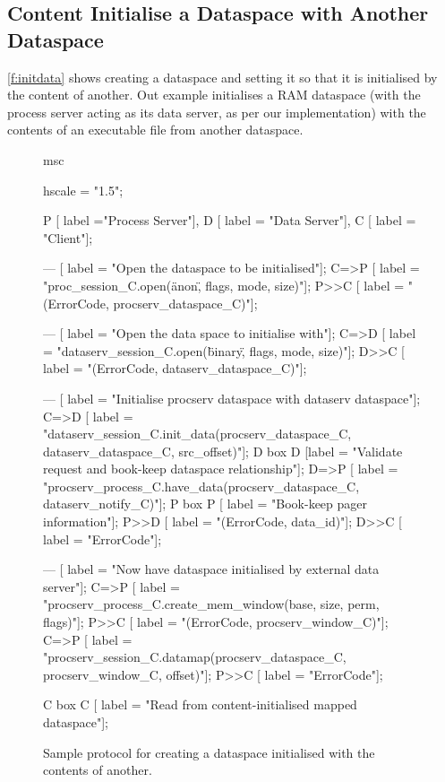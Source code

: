 \clearpage
\subsection{Content Initialise a Dataspace with Another Dataspace}

\autoref{f:initdata} shows creating a dataspace and setting it so that it is initialised by the
content of another. Out example initialises a RAM dataspace (with the process server acting as its
data server, as per our implementation) with the contents of an executable file from another
dataspace.

\begin{figure}[htb]
  \begin{center}
    \begin{msc}
      msc {
        hscale = "1.5";

        P [ label ="Process Server"],
        D [ label = "Data Server"],
        C [ label = "Client"];

        --- [ label = "Open the dataspace to be initialised"];
        C=>P [ label = "proc\_session\_C.open(\"anon\", flags, mode, size)"];
        P>>C [ label = "(ErrorCode, procserv\_dataspace\_C)"];

        --- [ label = "Open the data space to initialise with"];
        C=>D [ label = "dataserv\_session\_C.open(\"binary\", flags, mode, size)"];
        D>>C [ label = "(ErrorCode, dataserv\_dataspace\_C)"];

        --- [ label = "Initialise procserv dataspace with dataserv dataspace"];
        C=>D [ label = "dataserv\_session\_C.init\_data(procserv\_dataspace\_C, dataserv\_dataspace\_C, src\_offset)"];
        D box D [label = "Validate request and book-keep dataspace relationship"];
        D=>P [ label = "procserv\_process\_C.have\_data(procserv\_dataspace\_C, dataserv\_notify\_C)"];
        P box P [ label = "Book-keep pager information"];
        P>>D [ label = "(ErrorCode, data\_id)"];
        D>>C [ label = "ErrorCode"];

        --- [ label = "Now have dataspace initialised by external data server"];
        C=>P [ label = "procserv\_process\_C.create\_mem\_window(base, size, perm, flags)"];
        P>>C [ label = "(ErrorCode, procserv\_window\_C)"];
        C=>P [ label = "procserv\_session\_C.datamap(procserv\_dataspace\_C, procserv\_window\_C, offset)"];
        P>>C [ label = "ErrorCode"];

        C box C [ label = "Read from content-initialised mapped dataspace"];
      }
    \end{msc}
  \end{center}
  \caption{Sample protocol for creating a dataspace initialised with the contents of another.}
  \label{f:initdata}
\end{figure}


